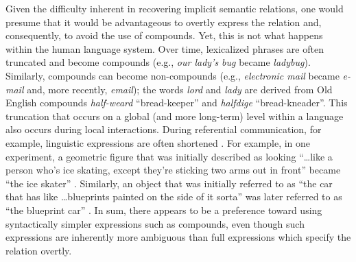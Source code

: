 \documentclass[output=paper]{langsci/langscibook}
\begin{document}
Given the difficulty inherent in recovering implicit semantic
relations, one would presume that it would be advantageous to overtly
express the relation and, consequently, to avoid the use of
compounds. Yet, this is not what happens within the human language
system. Over time, lexicalized phrases are often truncated and become
compounds (e.g., \textit{our lady’s bug} became
\textit{ladybug}). Similarly, compounds can become non-compounds
(e.g., \textit{electronic mail} became \textit{e-mail} and, more
recently, \textit{email}); the words \textit{lord} and \textit{lady}
are derived from Old English compounds \textit{half-weard}
“bread-keeper” and \textit{halfdige} “bread-kneader”. This truncation
that occurs on a global (and more long-term) level within a language
also occurs during local interactions.  During referential
communication, for example, linguistic expressions are often shortened
\citep{garrod1987saying,brennan1996conceptual}. For example, in one
experiment, a geometric figure that was initially described as looking
“\ldots like a person who’s ice skating, except they’re sticking two
arms out in front” became “the ice skater”
\citep{clark1986referring}. Similarly, an object that was initially
referred to as “the car that has like \ldots blueprints painted on the
side of it sorta” was later referred to as “the blueprint car”
\citep{metzing2003conceptual}. In sum, there appears to be a
preference toward using syntactically simpler expressions such as
compounds, even though such expressions are inherently more ambiguous
than full expressions which specify the relation overtly.
\end{document}

